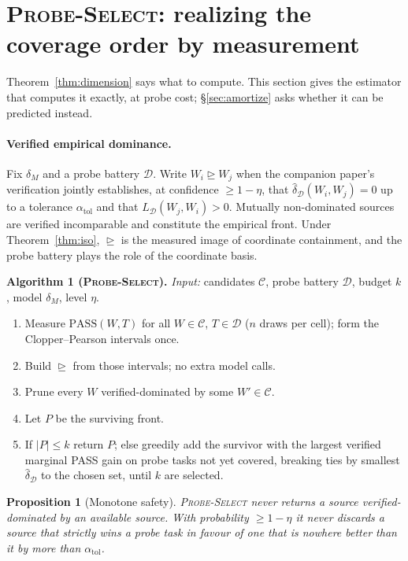 \documentclass[11pt]{article}
\theoremstyle{plain}
\newtheorem{proposition}{Proposition}
\theoremstyle{definition}
\theoremstyle{remark}
\newcommand{\PASS}{\mathrm{PASS}}
\newcommand{\dhat}{\widehat{\delta}}
\newcommand{\Dcal}{\mathcal{D}}
\newcommand{\Ccal}{\mathcal{C}}
\begin{document}
\section{\textsc{Probe-Select}: realizing the coverage order by measurement}
\label{sec:probeselect}

Theorem~\ref{thm:dimension} says what to compute. This section gives the estimator that computes it
exactly, at probe cost; \S\ref{sec:amortize} asks whether it can be predicted instead.

\paragraph{Verified empirical dominance.}
Fix $\delta_M$ and a probe battery $\Dcal$. Write $W_i \trianglerighteq W_j$ when the companion
paper's verification jointly establishes, at confidence $\ge 1-\eta$, that
$\dhat_{\Dcal}(W_i,W_j)=0$ up to a tolerance $\alpha_{\mathrm{tol}}$ and that
$L_{\Dcal}(W_j,W_i)>0$. Mutually non-dominated sources are verified incomparable and constitute the
empirical front. Under Theorem~\ref{thm:iso}, $\trianglerighteq$ is the measured image of
coordinate containment, and the probe battery plays the role of the coordinate basis.

\noindent\textbf{Algorithm 1 (\textsc{Probe-Select}).} \emph{Input:} candidates $\Ccal$, probe
battery $\Dcal$, budget $k$, model $\delta_M$, level $\eta$.
\begin{enumerate}[leftmargin=2.2em,itemsep=2pt]
  \item Measure $\PASS(W,T)$ for all $W \in \Ccal$, $T \in \Dcal$ ($n$ draws per cell); form the
    Clopper--Pearson intervals once.
  \item Build $\trianglerighteq$ from those intervals; no extra model calls.
  \item Prune every $W$ verified-dominated by some $W' \in \Ccal$.
  \item Let $P$ be the surviving front.
  \item If $|P| \le k$ return $P$; else greedily add the survivor with the largest verified
    marginal PASS gain on probe tasks not yet covered, breaking ties by smallest $\dhat_{\Dcal}$ to
    the chosen set, until $k$ are selected.
\end{enumerate}

\begin{proposition}[Monotone safety]\label{prop:safe}
\textsc{Probe-Select} never returns a source verified-dominated by an available source. With
probability $\ge 1-\eta$ it never discards a source that strictly wins a probe task in favour of
one that is nowhere better than it by more than $\alpha_{\mathrm{tol}}$.
\end{proposition}
\end{document}
